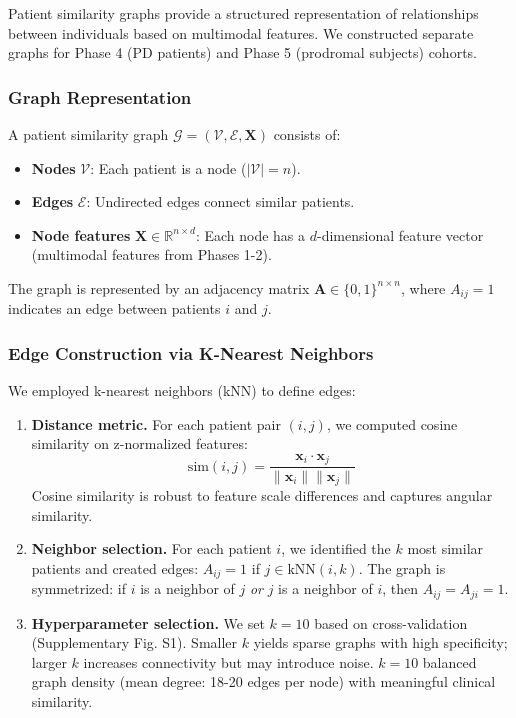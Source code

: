 
Patient similarity graphs provide a structured representation of relationships between individuals based on multimodal features\cite{parisot2018disease,kazi2019graph}. We constructed separate graphs for Phase 4 (PD patients) and Phase 5 (prodromal subjects) cohorts.

\subsubsection{Graph Representation}

A patient similarity graph $\mathcal{G} = (\mathcal{V}, \mathcal{E}, \mathbf{X})$ consists of:
\begin{itemize}
    \item \textbf{Nodes} $\mathcal{V}$: Each patient is a node ($|\mathcal{V}| = n$).
    \item \textbf{Edges} $\mathcal{E}$: Undirected edges connect similar patients.
    \item \textbf{Node features} $\mathbf{X} \in \mathbb{R}^{n \times d}$: Each node has a $d$-dimensional feature vector (multimodal features from Phases 1-2).
\end{itemize}

The graph is represented by an adjacency matrix $\mathbf{A} \in \{0,1\}^{n \times n}$, where $A_{ij} = 1$ indicates an edge between patients $i$ and $j$.

\subsubsection{Edge Construction via K-Nearest Neighbors}

We employed k-nearest neighbors (kNN) to define edges:

\begin{enumerate}
    \item \textbf{Distance metric.} For each patient pair $(i, j)$, we computed cosine similarity on z-normalized features:
    \begin{equation}
        \text{sim}(i, j) = \frac{\mathbf{x}_i \cdot \mathbf{x}_j}{\|\mathbf{x}_i\| \|\mathbf{x}_j\|}
    \end{equation}
    Cosine similarity is robust to feature scale differences and captures angular similarity\cite{parisot2018disease}.
    
    \item \textbf{Neighbor selection.} For each patient $i$, we identified the $k$ most similar patients and created edges: $A_{ij} = 1$ if $j \in \text{kNN}(i, k)$. The graph is symmetrized: if $i$ is a neighbor of $j$ \textit{or} $j$ is a neighbor of $i$, then $A_{ij} = A_{ji} = 1$.
    
    \item \textbf{Hyperparameter selection.} We set $k=10$ based on cross-validation (Supplementary Fig. S1). Smaller $k$ yields sparse graphs with high specificity; larger $k$ increases connectivity but may introduce noise. $k=10$ balanced graph density (mean degree: 18-20 edges per node) with meaningful clinical similarity.
\end{enumerate}

